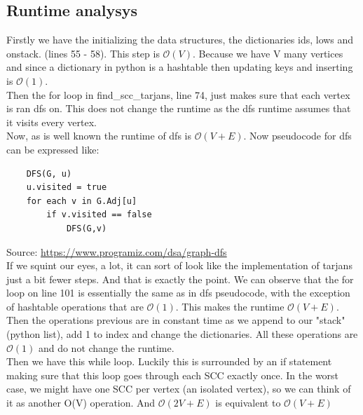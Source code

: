 \documentclass{article}
\begin{document}
\subsection{Runtime analysys}

Firstly we have the initializing the data structures, the dictionaries ids, lows and onstack. (lines 55 - 58). This step is $\mathcal{O}(V)$. Because we have V many vertices and since a dictionary in python is a hashtable then updating keys and inserting is $\mathcal{O}(1)$.\\
Then the for loop in find\_scc\_tarjans, line 74, just makes sure that each vertex is ran dfs on. This does not change the runtime as the dfs runtime assumes that it visits every vertex.
\\
Now, as is well known the runtime of dfs is $\mathcal{O}(V + E)$. Now pseudocode for dfs can be expressed like:
\begin{lstlisting}
    DFS(G, u)
    u.visited = true
    for each v in G.Adj[u]
        if v.visited == false
            DFS(G,v)
\end{lstlisting}

Source: \hyperlink{Programiz}{https://www.programiz.com/dsa/graph-dfs}\\
If we squint our eyes, a lot, it can sort of look like the implementation of tarjans just a bit fewer steps. And that is exactly the point. We can observe that the for loop on line 101 is essentially the same as in dfs pseudocode, with the exception of hashtable operations that are $\mathcal{O}(1)$. This makes the runtime $\mathcal{O}(V+E)$.\\
Then the operations previous are in constant time as we append to our "stack" (python list), add 1 to index and change the dictionaries. All these operations are  $\mathcal{O}(1)$ and do not change the runtime.\\
Then we have this while loop. Luckily this is surrounded by an if statement making sure that this loop goes through each SCC exactly once. In the worst case, we might have one SCC per vertex (an isolated vertex), so we can think of it as another O(V) operation. And $\mathcal{O}(2V + E)$ is equivalent to $\mathcal{O}(V+E)$
\end{document}
